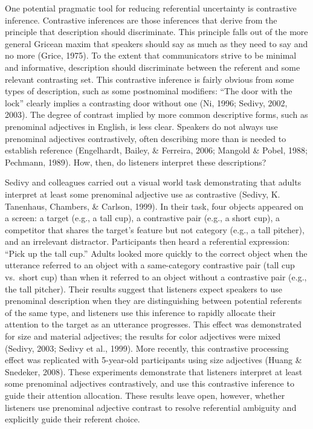 \documentclass[10pt, letterpaper]{article}
\begin{document}
One potential pragmatic tool for reducing referential uncertainty is
contrastive inference. Contrastive inferences are those inferences that
derive from the principle that description should discriminate. This
principle falls out of the more general Gricean maxim that speakers
should say as much as they need to say and no more (Grice, 1975). To the
extent that communicators strive to be minimal and informative,
description should discriminate between the referent and some relevant
contrasting set. This contrastive inference is fairly obvious from some
types of description, such as some postnominal modifiers: ``The door
with the lock'' clearly implies a contrasting door without one (Ni,
1996; Sedivy, 2002, 2003). The degree of contrast implied by more common
descriptive forms, such as prenominal adjectives in English, is less
clear. Speakers do not always use prenominal adjectives contrastively,
often describing more than is needed to establish reference (Engelhardt,
Bailey, \& Ferreira, 2006; Mangold \& Pobel, 1988; Pechmann, 1989). How,
then, do listeners interpret these descriptions?

Sedivy and colleagues carried out a visual world task demonstrating that
adults interpret at least some prenominal adjective use as contrastive
(Sedivy, K. Tanenhaus, Chambers, \& Carlson, 1999). In their task, four
objects appeared on a screen: a target (e.g., a tall cup), a contrastive
pair (e.g., a short cup), a competitor that shares the target's feature
but not category (e.g., a tall pitcher), and an irrelevant distractor.
Participants then heard a referential expression: ``Pick up the tall
cup.'' Adults looked more quickly to the correct object when the
utterance referred to an object with a same-category contrastive pair
(tall cup vs.~short cup) than when it referred to an object without a
contrastive pair (e.g., the tall pitcher). Their results suggest that
listeners expect speakers to use prenominal description when they are
distinguishing between potential referents of the same type, and
listeners use this inference to rapidly allocate their attention to the
target as an utterance progresses. This effect was demonstrated for size
and material adjectives; the results for color adjectives were mixed
(Sedivy, 2003; Sedivy et al., 1999). More recently, this contrastive
processing effect was replicated with 5-year-old participants using size
adjectives (Huang \& Snedeker, 2008). These experiments demonstrate that
listeners interpret at least some prenominal adjectives contrastively,
and use this contrastive inference to guide their attention allocation.
These results leave open, however, whether listeners use prenominal
adjective contrast to resolve referential ambiguity and explicitly guide
their referent choice.
\end{document}
